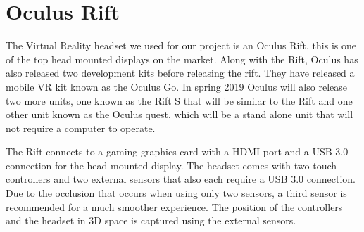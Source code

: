 
\section {Oculus Rift}
The Virtual Reality headset we used for our project is an Oculus Rift, this is one of the top head mounted displays on the market. Along with the Rift, Oculus has also released two development kits before releasing the rift. They have released a mobile VR kit known as the Oculus Go. In spring 2019 Oculus will also release two more units, one known as the Rift S that will be similar to the Rift and one other unit known as the Oculus quest, which will be a stand alone unit that will not require a computer to operate. \newline

The Rift connects to a gaming graphics card with a HDMI port and a USB 3.0 connection for the head mounted display. The headset comes with two touch controllers and two external sensors that also each require a USB 3.0 connection. Due to the occlusion that occurs when using only two sensors, a third sensor is recommended for a much smoother experience. The position of the controllers and the headset in 3D space is captured using the external sensors.